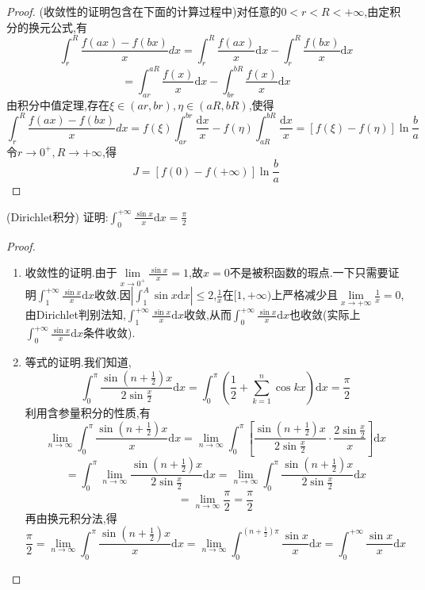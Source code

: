 \begin{proof}
	(收敛性的证明包含在下面的计算过程中)对任意的$0<r<R<+\infty$,由定积分的换元公式,有
	$$
		\int_r^R{\frac{f\left( ax \right) -f\left( bx \right)}{x}dx}=\int_r^R{\frac{f\left( ax \right)}{x}\text{d}x}-\int_r^R{\frac{f\left( bx \right)}{x}\text{d}x}
	$$
	$$
		=\int_{ar}^{aR}{\frac{f\left( x \right)}{x}\text{d}x}-\int_{br}^{bR}{\frac{f\left( x \right)}{x}\text{d}x}
	$$
	由积分中值定理,存在$\xi \in (ar,br),\eta \in (aR,bR)$,使得
	$$
		\int_r^R{\frac{f\left( ax \right) -f\left( bx \right)}{x}dx}=f\left( \xi \right) \int_{ar}^{br}{ \frac{\text{d}x}{x}-f\left( \eta \right)}\int_{aR}^{bR}{\frac{\text{d}x}{x}}=\left[ f\left( \xi \right) -f\left( \eta \right) \right] \ln \frac{b}{a}
	$$
	令$r \rightarrow 0^+,R \rightarrow +\infty$,得
	$$
		J=\left[ f\left( 0 \right) -f\left( +\infty \right) \right] \ln \frac{b}{a}
	$$
\end{proof}

\begin{example}
	(Dirichlet积分) 证明:$
		\int_0^{+\infty}{\frac{\sin x}{x}\text{d}x}=\frac{\pi}{2}
	$
\end{example}

\begin{proof}
	\begin{enumerate}
		\item 收敛性的证明.由于$
			      \lim\limits_{x\rightarrow 0^+}\frac{\sin x}{x}=1
		      $,故$x=0$不是被积函数的瑕点.一下只需要证明$\int_1^{+\infty}{\frac{\sin x}{x}\text{d}x}$收敛.因$
			      \left| \int_1^A{\sin x\text{d}x} \right|\le 2
		      $,$
			      \frac{1}{x}
		      $在$[1,+\infty)$上严格减少且$\lim\limits_{x\rightarrow +\infty}\frac{1}{x}=0$,由Dirichlet判别法知,$\int_1^{+\infty}{\frac{\sin x}{x}\text{d}x}$收敛,从而$\int_0^{+\infty}{\frac{\sin x}{x}\text{d}x}$也收敛(实际上$\int_0^{+\infty}{\frac{\sin x}{x}\text{d}x}$条件收敛).
		\item 等式的证明.我们知道,
		      $$
			      \int_0^{\pi}{\frac{\sin \left( n+\frac{1}{2} \right)x}{2\sin \frac{x}{2}}\text{d}x}=\int_0^{\pi}{\left( \frac{1}{2}+\sum_{k=1}^n{\cos kx} \right) \text{d}x=\frac{\pi}{2}}
		      $$
		      利用含参量积分的性质,有
		      $$
			      \lim_{n\rightarrow \infty}\int_0^{\pi}{\frac{\sin \left( n+\frac{1}{2} \right) x}{x}\text{d}x}=\lim_{n\rightarrow \infty}\int_0^{\pi}{\left[ \frac{\sin \left( n+\frac{1}{2} \right) x}{2\sin \frac{x}{2}}\cdot \frac{2\sin \frac{x}{2}}{x} \right] \text{d}x}
		      $$
		      $$
			      =\int_0^{\pi}{\lim_{n\rightarrow \infty}\frac{\sin \left( n+\frac{1}{2} \right) x}{2\sin \frac{x}{2}}\text{d}x}=\lim_{n\rightarrow \infty}\int_0^{\pi}{\frac{\sin \left( n+\frac{1}{2} \right) x}{2 \sin \frac{x}{2}}\text{d}x}
		      $$
		      $$
			      =\lim_{n\rightarrow \infty}\frac{\pi}{2}=\frac{\pi}{2}
		      $$
		      再由换元积分法,得
		      $$
			      \frac{\pi}{2}=\lim_{n\rightarrow \infty}\int_0^{\pi}{\frac{\sin \left( n+\frac{1}{2} \right) x}{x}\text{d}x}=\lim_{n\rightarrow \infty}\int_0^{\left( n+\frac{1}{2} \right) \pi}{\frac{\sin x}{x}\text{d}x}=\int_0^{+\infty}{\frac{\sin x}{x}\text{d}x}
		      $$
	\end{enumerate}
\end{proof}


